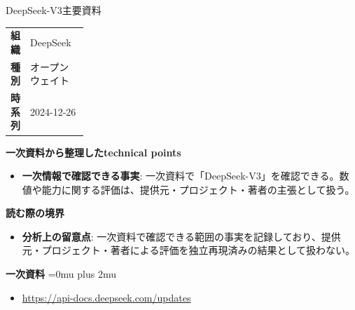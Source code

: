 \begin{technicalnote}{DeepSeek-V3}{主要資料}
\begingroup
\begin{tabularx}{\linewidth}{@{}>{\bfseries}p{0.22\linewidth}X@{}}
組織 & DeepSeek \\
種別 & オープンウェイト \\
時系列 & 2024-12-26 \\
\end{tabularx}
\smallskip
{\bfseries 一次資料から整理したtechnical points}
\begin{itemize}[leftmargin=1.5em,itemsep=0.35em]
\item \textbf{一次情報で確認できる事実}: 一次資料で「DeepSeek-V3」を確認できる。数値や能力に関する評価は、提供元・プロジェクト・著者の主張として扱う。
\end{itemize}
\begin{minipage}{\linewidth}
{\bfseries 読む際の境界}
\begin{itemize}[leftmargin=1.5em,itemsep=0.35em]
\item \textbf{分析上の留意点}: 一次資料で確認できる範囲の事実を記録しており、提供元・プロジェクト・著者による評価を独立再現済みの結果として扱わない。
\end{itemize}
\begin{samepage}
{\bfseries 一次資料}
\begingroup\sloppy
\Urlmuskip=0mu plus 2mu\relax
\begin{itemize}[leftmargin=1.5em,itemsep=0.25em]
\item {\scriptsize\url{https://api-docs.deepseek.com/updates}}
\end{itemize}
\endgroup
\end{samepage}
\end{minipage}
\endgroup
\end{technicalnote}
\medskip

